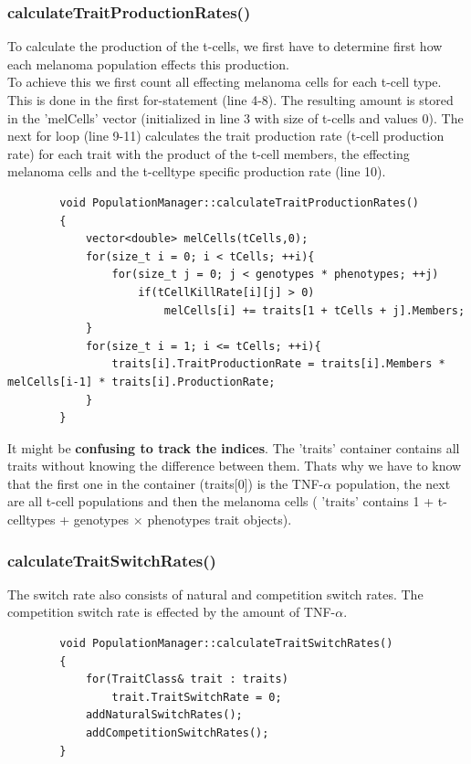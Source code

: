\documentclass[a4paper,10pt]{scrartcl}
\begin{document}
		\subsubsection{calculateTraitProductionRates()}
		To calculate the production of the t-cells, we first have to determine first how each melanoma population effects this production.\\
		To achieve this we first count all effecting melanoma cells for each t-cell type. This is done in the first for-statement (line 4-8). The resulting amount is stored in the 'melCells' vector (initialized in line 3 with size of t-cells and values 0).
		The next for loop (line 9-11) calculates the trait production rate (t-cell production rate) for each trait with the product of the t-cell members, the effecting melanoma cells and the t-celltype specific production rate (line 10).
		\begin{lstlisting} 
		void PopulationManager::calculateTraitProductionRates()
		{
		    vector<double> melCells(tCells,0);
		    for(size_t i = 0; i < tCells; ++i){
		        for(size_t j = 0; j < genotypes * phenotypes; ++j)
		            if(tCellKillRate[i][j] > 0)
		                melCells[i] += traits[1 + tCells + j].Members;
		    }
		    for(size_t i = 1; i <= tCells; ++i){
		        traits[i].TraitProductionRate = traits[i].Members * melCells[i-1] * traits[i].ProductionRate;
		    }
		}
		\end{lstlisting}
		It might be \textbf{confusing to track the indices}. The 'traits' container contains all traits without knowing the difference between them. Thats why we have to know that the first one in the container (traits[0]) is the TNF-$ \alpha $ population, the next are all t-cell populations and then the melanoma cells ( 'traits' contains 1 + t-celltypes + genotypes $ \times $ phenotypes trait objects).
		
		\subsubsection{calculateTraitSwitchRates()}
		The switch rate also consists of natural and competition switch rates. The competition switch rate is effected by the amount of TNF-$ \alpha $.
		\begin{lstlisting} 
		void PopulationManager::calculateTraitSwitchRates()
		{
		    for(TraitClass& trait : traits)
		        trait.TraitSwitchRate = 0;
		    addNaturalSwitchRates();
		    addCompetitionSwitchRates();
		}
		\end{lstlisting}
\end{document}
